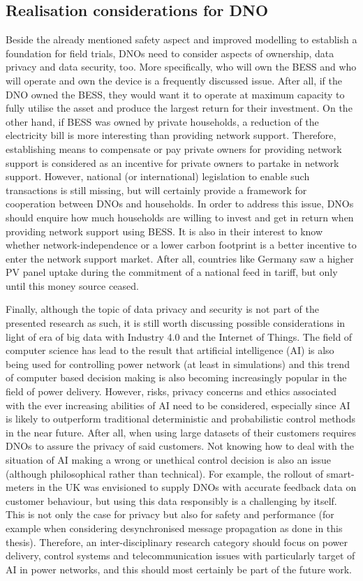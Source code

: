 \subsection{Realisation considerations for DNO}

Beside the already mentioned safety aspect and improved modelling to establish a foundation for field trials, DNOs need to consider aspects of ownership, data privacy and data security, too.
More specifically, who will own the BESS and who will operate and own the device is a frequently discussed issue.
After all, if the DNO owned the BESS, they would want it to operate at maximum capacity to fully utilise the asset and produce the largest return for their investment.
On the other hand, if BESS was owned by private households, a reduction of the electricity bill is more interesting than providing network support.
Therefore, establishing means to compensate or pay private owners for providing network support is considered as an incentive for private owners to partake in network support.
However, national (or international) legislation to enable such transactions is still missing, but will certainly provide a framework for cooperation between DNOs and households.
In order to address this issue, DNOs should enquire how much households are willing to invest and get in return when providing network support using BESS.
It is also in their interest to know whether network-independence or a lower carbon footprint is a better incentive to enter the network support market.
After all, countries like Germany saw a higher PV panel uptake during the commitment of a national feed in tariff, but only until this money source ceased.

Finally, although the topic of data privacy and security is not part of the presented research as such, it is still worth discussing possible considerations in light of era of big data with Industry 4.0 and the Internet of Things.
The field of computer science has lead to the result that artificial intelligence (AI) is also being used for controlling power network (at least in simulations) and this trend of computer based decision making is also becoming increasingly popular in the field of power delivery.
However, risks, privacy concerns and ethics associated with the ever increasing abilities of AI need to be considered, especially since AI is likely to outperform traditional deterministic and probabilistic control methods in the near future.
After all, when using large datasets of their customers requires DNOs to assure the privacy of said customers.
Not knowing how to deal with the situation of AI making a wrong or unethical control decision is also an issue (although philosophical rather than technical).
For example, the rollout of smart-meters in the UK was envisioned to supply DNOs with accurate feedback data on customer behaviour, but using this data responsibly is a challenging by itself.
This is not only the case for privacy but also for safety and performance (for example when considering desynchronised message propagation as done in this thesis).
Therefore, an inter-disciplinary research category should focus on power delivery, control systems and telecommunication issues with particularly target of AI in power networks, and this should most certainly be part of the future work.
